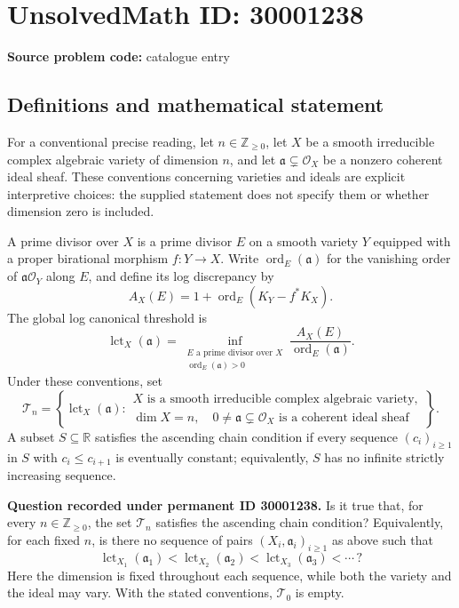 \documentclass[11pt]{article}
\newcommand{\Z}{\mathbb{Z}}
\newcommand{\R}{\mathbb{R}}
\begin{document}
\section*{UnsolvedMath ID: 30001238}
\textbf{Source problem code:} catalogue entry
\subsection{Definitions and mathematical statement}
For a conventional precise reading, let \(n\in\Z_{\geq 0}\), let \(X\) be a smooth irreducible complex algebraic variety of dimension \(n\), and let \(\mathfrak a\subsetneq\mathcal O_X\) be a nonzero coherent ideal sheaf. These conventions concerning varieties and ideals are explicit interpretive choices: the supplied statement does not specify them or whether dimension zero is included.

A prime divisor over \(X\) is a prime divisor \(E\) on a smooth variety \(Y\) equipped with a proper birational morphism \(f:Y\to X\). Write \(\operatorname{ord}_E(\mathfrak a)\) for the vanishing order of \(\mathfrak a\mathcal O_Y\) along \(E\), and define its log discrepancy by
\[
A_X(E)=1+\operatorname{ord}_E(K_Y-f^*K_X).
\]
The global log canonical threshold is
\[
\operatorname{lct}_X(\mathfrak a)
=\inf_{\substack{E\text{ a prime divisor over }X\\ \operatorname{ord}_E(\mathfrak a)>0}}
\frac{A_X(E)}{\operatorname{ord}_E(\mathfrak a)}.
\]
Under these conventions, set
\[
\mathcal T_n=
\left\{\operatorname{lct}_X(\mathfrak a):
\begin{array}{l}
X\text{ is a smooth irreducible complex algebraic variety},\\
\dim X=n,\quad 0\ne\mathfrak a\subsetneq\mathcal O_X
\text{ is a coherent ideal sheaf}
\end{array}\right\}.
\]
A subset \(S\subseteq\R\) satisfies the ascending chain condition if every sequence \((c_i)_{i\geq1}\) in \(S\) with \(c_i\leq c_{i+1}\) is eventually constant; equivalently, \(S\) has no infinite strictly increasing sequence.

\textbf{Question recorded under permanent ID 30001238.} Is it true that, for every \(n\in\Z_{\geq0}\), the set \(\mathcal T_n\) satisfies the ascending chain condition? Equivalently, for each fixed \(n\), is there no sequence of pairs \((X_i,\mathfrak a_i)_{i\geq1}\) as above such that
\[
\operatorname{lct}_{X_1}(\mathfrak a_1)
<\operatorname{lct}_{X_2}(\mathfrak a_2)
<\operatorname{lct}_{X_3}(\mathfrak a_3)<\cdots\,?
\]
Here the dimension is fixed throughout each sequence, while both the variety and the ideal may vary. With the stated conventions, \(\mathcal T_0\) is empty.
\end{document}
